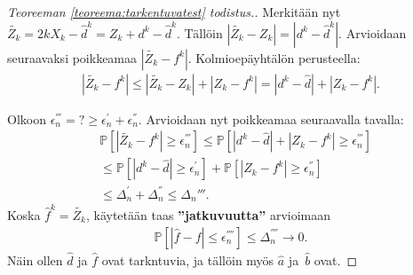 \documentclass[finnish,12pt,a4paper,pdftex,sci,utf8]{aaltothesis}
\begin{document}
\begin{proof}[Teoreeman \ref{teoreema:tarkentuvatest} todistus.]
	Merkitään nyt $\tilde{Z_k} = 2kX_k - \hat{d}^k = Z_k + d^k - \hat{d}^k$. Tällöin $|\tilde{Z_k} - Z_k | = |d^k - \hat{d}^k |$. Arvioidaan seuraavaksi poikkeamaa $|\tilde{Z_k} - f^k|$. Kolmioepäyhtälön  perusteella:
	\begin{align*}
		|\tilde{Z_k} - f^k| \leq |\tilde{Z_k} - Z_k| + |Z_k - f^k| = |d^k - \hat{d}| + |Z_k - f^k|.
	\end{align*}

	Olkoon $\epsilon_n^{'''} = ? \geq \epsilon_n^{'} + \epsilon_n^{''}$. Arvioidaan nyt poikkeamaa seuraavalla tavalla:
	\begin{align*}
		&\mathbb{P}[|\tilde{Z_k}-f^k| \geq \epsilon_n^{'''}] \leq \mathbb{P}[|d^k - \hat{d}| + |Z_k - f^k| \geq \epsilon_n^{'''}] \\
		&\leq \mathbb{P}[|d^k - \hat{d}| \geq \epsilon_n^{'}] + \mathbb{P}[|Z_k-f^k| \geq \epsilon_n^{''}] \\
		&\leq \Delta_n^{'} + \Delta_n^{''} \leq \Delta_n{'''}.
	\end{align*} 
	Koska $\hat{f}^k = \tilde{Z_k}$, käytetään taas \textbf{''jatkuvuutta''} arvioimaan
	\begin{align*}
		\mathbb{P}[|\hat{f} - f| \leq \epsilon_n^{''''}] \leq \Delta_n^{''''} \rightarrow 0.
	\end{align*}
	Näin ollen $\hat{d}$ ja $\hat{f}$ ovat tarkntuvia, ja tällöin myös $\hat{a}$ ja $\hat{b}$ ovat.
\end{proof}
\end{document}
